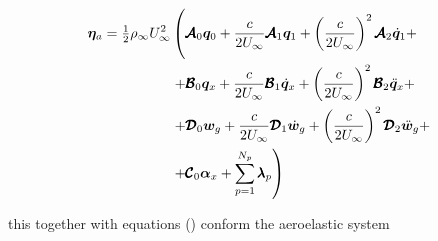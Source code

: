 \documentclass[11pt]{article}
\begin{document}
\begin{equation}\label{eq3:eta_full}
\begin{split}
\bm{\eta}_a = \tfrac12\rho_\infty U_\infty^2 & \left(\vphantom{\sum_{p=1}^{N_p}} \pmb{\mathcal{A}}_0\bm{q}_0 +\frac{c}{2U_\infty}\pmb{\mathcal{A}}_1 \bm{q}_1 +\left(\frac{c}{2U_\infty}\right)^2 \pmb{\mathcal{A}}_2\dot{\bm{q}}_1 +  \right.  \\
& \left. + \pmb{\mathcal{B}}_0\bm{q}_x +\frac{c}{2U_\infty}\pmb{\mathcal{B}}_1 \dot{\bm{q}}_x +\left(\frac{c}{2U_\infty}\right)^2 \pmb{\mathcal{B}}_2\ddot{\bm{q}}_x +  \right.  \\
& \left. + \pmb{\mathcal{D}}_{0}\bm{w}_g +\frac{c}{2U_\infty}\pmb{\mathcal{D}}_{1} \dot{\bm{w}}_g +\left(\frac{c}{2U_\infty}\right)^2 \pmb{\mathcal{D}}_{2}\ddot{\bm{w}}_g +  \right.  \\
& \left. + \pmb{\mathcal{C}}_0\bm{\alpha}_x \vphantom{\sum_{p=1}^{N_p}} + \sum_{p=1}^{N_p} \pmb{\lambda}_p  \right) 
\end{split}
\end{equation}

this together with equations () conform the aeroelastic system  
\end{document}
